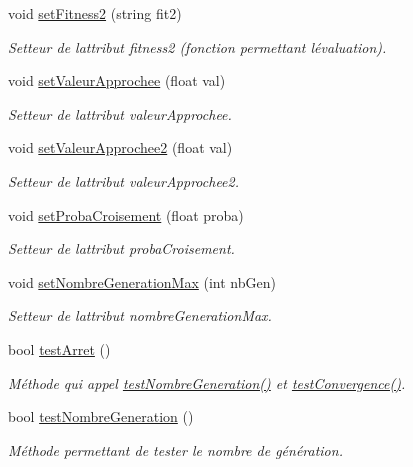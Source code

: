 \begin{DoxyCompactItemize}
void \hyperlink{class_population_af5940422c47c86ea6eb606224016d32d}{set\+Fitness2} (string fit2)
\begin{DoxyCompactList}\small\item\em Setteur de l\textquotesingle{}attribut fitness2 (fonction permettant l\textquotesingle{}évaluation). \end{DoxyCompactList}\item 
void \hyperlink{class_population_ad3e0a26ca7b57924bcbb7a57d86056e4}{set\+Valeur\+Approchee} (float val)
\begin{DoxyCompactList}\small\item\em Setteur de l\textquotesingle{}attribut valeur\+Approchee. \end{DoxyCompactList}\item 
void \hyperlink{class_population_aa5645305dfca65e640ed76da9f851137}{set\+Valeur\+Approchee2} (float val)
\begin{DoxyCompactList}\small\item\em Setteur de l\textquotesingle{}attribut valeur\+Approchee2. \end{DoxyCompactList}\item 
void \hyperlink{class_population_a175f3a21b85681e318063e9eb63550a8}{set\+Proba\+Croisement} (float proba)
\begin{DoxyCompactList}\small\item\em Setteur de l\textquotesingle{}attribut proba\+Croisement. \end{DoxyCompactList}\item 
void \hyperlink{class_population_a85da2cfbfb4cde5c3ed879958385904c}{set\+Nombre\+Generation\+Max} (int nb\+Gen)
\begin{DoxyCompactList}\small\item\em Setteur de l\textquotesingle{}attribut nombre\+Generation\+Max. \end{DoxyCompactList}\item 
bool \hyperlink{class_population_a3ec157b1b22558f3b6aa49279d6fcd5a}{test\+Arret} ()
\begin{DoxyCompactList}\small\item\em Méthode qui appel \hyperlink{class_population_a9192297f35ab0c6c6078ae087b3e4aee}{test\+Nombre\+Generation()} et \hyperlink{class_population_ae3511322c007fc85a8dd9bda0693b9cf}{test\+Convergence()}. \end{DoxyCompactList}\item 
bool \hyperlink{class_population_a9192297f35ab0c6c6078ae087b3e4aee}{test\+Nombre\+Generation} ()
\begin{DoxyCompactList}\small\item\em Méthode permettant de tester le nombre de génération. \end{DoxyCompactList}\item 

\end{DoxyCompactItemize}
